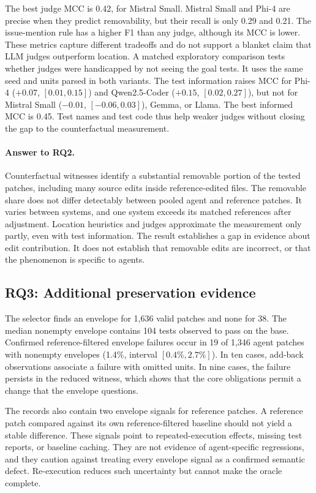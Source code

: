 \documentclass[a4paper,fleqn]{cas-sc}
\begin{document}
The best judge MCC is 0.42, for Mistral Small. Mistral Small and Phi-4 are precise when they predict removability, but their recall is only 0.29 and 0.21. The issue-mention rule has a higher F1 than any judge, although its MCC is lower. These metrics capture different tradeoffs and do not support a blanket claim that LLM judges outperform location. A matched exploratory comparison tests whether judges were handicapped by not seeing the goal tests. It uses the same seed and units parsed in both variants. The test information raises MCC for Phi-4 ($+0.07$, $[0.01, 0.15]$) and Qwen2.5-Coder ($+0.15$, $[0.02, 0.27]$), but not for Mistral Small ($-0.01$, $[-0.06, 0.03]$), Gemma, or Llama. The best informed MCC is 0.45. Test names and test code thus help weaker judges without closing the gap to the counterfactual measurement.

\paragraph{Answer to RQ2.}
Counterfactual witnesses identify a substantial removable portion of the tested patches, including many source edits inside reference-edited files. The removable share does not differ detectably between pooled agent and reference patches. It varies between systems, and one system exceeds its matched references after adjustment. Location heuristics and judges approximate the measurement only partly, even with test information. The result establishes a gap in evidence about edit contribution. It does not establish that removable edits are incorrect, or that the phenomenon is specific to agents.

\subsection{RQ3: Additional preservation evidence}\label{sec:rq3}

The selector finds an envelope for 1,636 valid patches and none for 38. The median nonempty envelope contains 104 tests observed to pass on the base. Confirmed reference-filtered envelope failures occur in 19 of 1,346 agent patches with nonempty envelopes (1.4\%, interval $[0.4\%, 2.7\%]$). In ten cases, add-back observations associate a failure with omitted units. In nine cases, the failure persists in the reduced witness, which shows that the core obligations permit a change that the envelope questions.

The records also contain two envelope signals for reference patches. A reference patch compared against its own reference-filtered baseline should not yield a stable difference. These signals point to repeated-execution effects, missing test reports, or baseline caching. They are not evidence of agent-specific regressions, and they caution against treating every envelope signal as a confirmed semantic defect. Re-execution reduces such uncertainty but cannot make the oracle complete.
\end{document}

